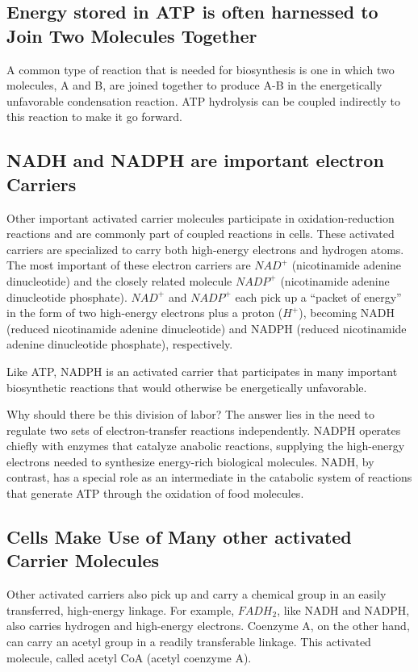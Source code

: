\subsection{Energy stored in ATP is often harnessed to Join Two Molecules Together}

A common type of reaction that is needed for biosynthesis is one in which
two molecules, A and B, are joined together to produce A-B in the energetically
unfavorable condensation reaction. ATP hydrolysis can be coupled indirectly to this
reaction to make it go forward.

\subsection{NADH and NADPH are important electron Carriers}

Other important activated carrier molecules participate in oxidation-reduction
reactions and are commonly part of coupled reactions in cells.
These activated carriers are specialized to carry both high-energy electrons
and hydrogen atoms. The most important of these electron carriers
are $NAD^{+}$ (nicotinamide adenine dinucleotide) and the closely related
molecule $NADP^{+}$ (nicotinamide adenine dinucleotide phosphate).
$NAD^{+}$ and $NADP^{+}$ each pick up a “packet of energy” in the form of two high-energy
electrons plus a proton ($H^{+}$), becoming NADH (reduced nicotinamide
adenine dinucleotide) and NADPH (reduced nicotinamide adenine dinucleotide
phosphate), respectively.

Like ATP, NADPH is an activated carrier that participates in many
important biosynthetic reactions that would otherwise be energetically
unfavorable.

Why should there be this division of labor? The answer lies in the need
to regulate two sets of electron-transfer reactions independently. NADPH
operates chiefly with enzymes that catalyze anabolic reactions, supplying
the high-energy electrons needed to synthesize energy-rich biological
molecules. NADH, by contrast, has a special role as an intermediate in
the catabolic system of reactions that generate ATP through the oxidation
of food molecules.

\subsection{Cells Make Use of Many other activated Carrier Molecules}

Other activated carriers also pick up and carry a chemical group in an
easily transferred, high-energy linkage. For example, $FADH_{2}$,
like NADH and NADPH, also carries hydrogen and high-energy electrons.
Coenzyme A, on the other hand, can carry an acetyl
group in a readily transferable linkage. This activated molecule, called
acetyl CoA (acetyl coenzyme A).

